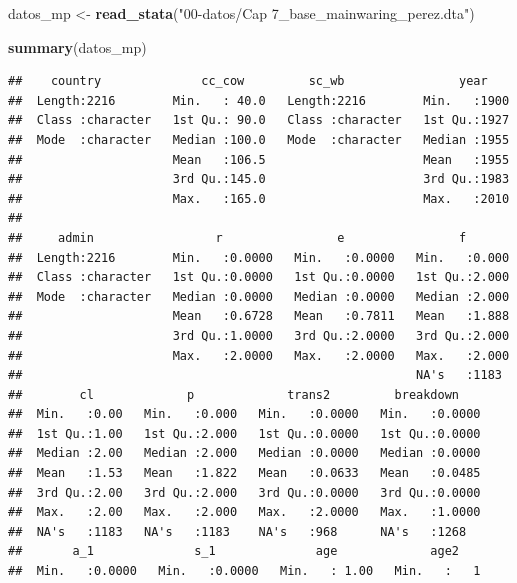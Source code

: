 \documentclass[]{book}
\newenvironment{Shaded}{\begin{snugshade}}{\end{snugshade}}
\newcommand{\KeywordTok}[1]{\textcolor[rgb]{0.13,0.29,0.53}{\textbf{#1}}}
\newcommand{\StringTok}[1]{\textcolor[rgb]{0.31,0.60,0.02}{#1}}
\newcommand{\NormalTok}[1]{#1}
\begin{document}
\begin{Shaded}
\begin{Highlighting}[]
\NormalTok{datos_mp <-}\StringTok{ }\KeywordTok{read_stata}\NormalTok{(}\StringTok{"00-datos/Cap 7_base_mainwaring_perez.dta"}\NormalTok{)}
\end{Highlighting}
\end{Shaded}

\begin{Shaded}
\begin{Highlighting}[]
\KeywordTok{summary}\NormalTok{(datos_mp)}
\end{Highlighting}
\end{Shaded}

\begin{verbatim}
##    country              cc_cow         sc_wb                year     
##  Length:2216        Min.   : 40.0   Length:2216        Min.   :1900  
##  Class :character   1st Qu.: 90.0   Class :character   1st Qu.:1927  
##  Mode  :character   Median :100.0   Mode  :character   Median :1955  
##                     Mean   :106.5                      Mean   :1955  
##                     3rd Qu.:145.0                      3rd Qu.:1983  
##                     Max.   :165.0                      Max.   :2010  
##                                                                      
##     admin                 r                e                f        
##  Length:2216        Min.   :0.0000   Min.   :0.0000   Min.   :0.000  
##  Class :character   1st Qu.:0.0000   1st Qu.:0.0000   1st Qu.:2.000  
##  Mode  :character   Median :0.0000   Median :0.0000   Median :2.000  
##                     Mean   :0.6728   Mean   :0.7811   Mean   :1.888  
##                     3rd Qu.:1.0000   3rd Qu.:2.0000   3rd Qu.:2.000  
##                     Max.   :2.0000   Max.   :2.0000   Max.   :2.000  
##                                                       NA's   :1183   
##        cl             p             trans2         breakdown     
##  Min.   :0.00   Min.   :0.000   Min.   :0.0000   Min.   :0.0000  
##  1st Qu.:1.00   1st Qu.:2.000   1st Qu.:0.0000   1st Qu.:0.0000  
##  Median :2.00   Median :2.000   Median :0.0000   Median :0.0000  
##  Mean   :1.53   Mean   :1.822   Mean   :0.0633   Mean   :0.0485  
##  3rd Qu.:2.00   3rd Qu.:2.000   3rd Qu.:0.0000   3rd Qu.:0.0000  
##  Max.   :2.00   Max.   :2.000   Max.   :2.0000   Max.   :1.0000  
##  NA's   :1183   NA's   :1183    NA's   :968      NA's   :1268    
##       a_1              s_1              age             age2     
##  Min.   :0.0000   Min.   :0.0000   Min.   : 1.00   Min.   :   1  

\end{verbatim}
\end{document}

